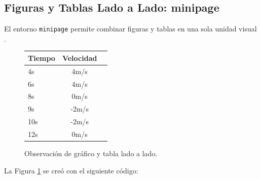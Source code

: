 \subsection{Figuras y Tablas Lado a Lado: minipage}

El entorno \texttt{minipage} permite combinar figuras y tablas en una sola unidad visual \cite{latex_project}.

\begin{figure}[ht]
\begin{minipage}{0.15\textwidth}
\centering
{}
\caption*{Gráfico}
\end{minipage}
\hfill
\begin{minipage}{0.15\textwidth}
\centering
\footnotesize
\begin{tabular}{lcc}
\toprule
\textbf{Tiempo} & \textbf{Velocidad} \\
\midrule
4s & 4m/s \\
6s & 4m/s \\
8s & 0m/s \\
9s & -2m/s \\
10s & -2m/s \\
12s & 0m/s \\
\bottomrule
\end{tabular}
\caption*{Datos}
\end{minipage}
\caption{Observación de gráfico y tabla lado a lado.}
\label{fig:ejemplo_minipage}
\end{figure}

La Figura \ref{fig:ejemplo_minipage} se creó con el siguiente código:

